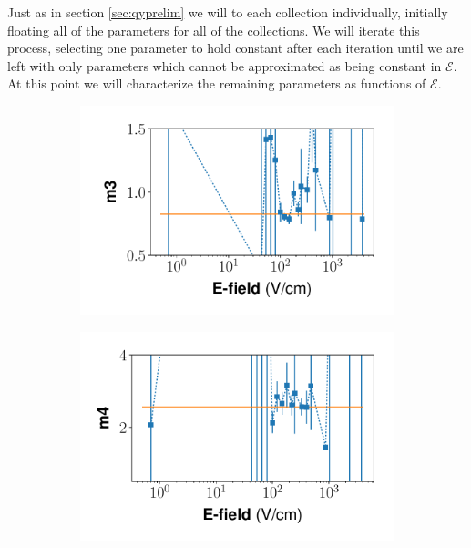 Just as in section \ref{sec:qyprelim} we will to each collection individually, initially floating all of the parameters for all of the collections. We will iterate this process, selecting one parameter to hold constant after each iteration until we are left with only parameters which cannot be approximated as being constant in $\mathcal{E}$. At this point we will characterize the remaining parameters as functions of $\mathcal{E}$. 
\begin{figure}[!h]
\centering
\begin{subfigure}{0.33\linewidth}
  \includegraphics[width=\textwidth]{Figures/Yields_fit_new/NEST_m3_fit_new.pdf}
  \caption{}
\end{subfigure}%
\begin{subfigure}{0.33\linewidth}
  \includegraphics[width=\textwidth]{Figures/Yields_fit_new/NEST_m4_fit_new.pdf}
  \caption{}
\end{subfigure}%

\end{figure}
